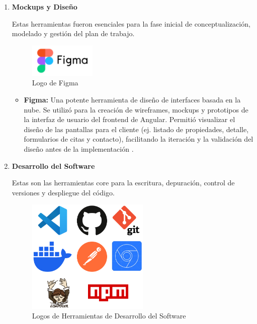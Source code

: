 \begin{enumerate}
    \item \textbf{Mockups y Diseño}

    Estas herramientas fueron esenciales para la fase inicial de conceptualización, modelado y gestión del plan de trabajo.

    \begin{figure}[H]
        \begin{center}
            \includegraphics[width = 0.30\textwidth]{Figuras/logofigma.png}
        \end{center}
        \caption{\label{fig:logofigma} Logo de Figma}
    \end{figure}
    
    \begin{itemize}
        \item \textbf{Figma:} Una potente herramienta de diseño de interfaces basada en la nube. Se utilizó para la creación de wireframes, mockups y prototipos de la interfaz de usuario del frontend de Angular. Permitió visualizar el diseño de las pantallas para el cliente (ej. listado de propiedades, detalle, formularios de citas y contacto), facilitando la iteración y la validación del diseño antes de la implementación \cite{figma2024help}.
    \end{itemize}

    \item \textbf{Desarrollo del Software}

    Estas son las herramientas core para la escritura, depuración, control de versiones y despliegue del código.

    \begin{figure}[H]
        \begin{center}
            \includegraphics[width = 0.55\textwidth]{Figuras/logosherramientasdesarrollosoftware.png}
        \end{center}
        \caption{\label{fig:logosherramientasdesarrollosoftware} Logos de Herramientas de Desarrollo del Software}
    \end{figure}


\end{enumerate}
